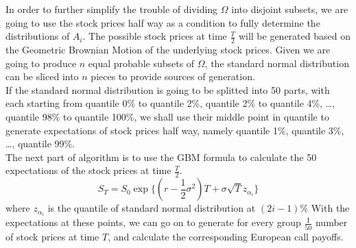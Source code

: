 In order to further simplify the trouble of dividing $\Omega$ into disjoint subsets, we are going to use the stock prices half way as a condition to fully determine the distributions of $A_{i}$. The possible stock prices at time $\frac{T}{2}$ will be generated based on the Geometric Brownian Motion of the underlying stock prices. Given we are going to produce $n$ equal probable subsets of $\Omega$, the standard normal distribution can be sliced into $n$ pieces to provide sources of generation.\\
If the standard normal distribution is going to be splitted into 50 parts, with each starting from quantile 0\% to quantile 2\%, quantile 2\% to quantile 4\%, \dots, quantile 98\% to quantile 100\%, we shall use their middle point in quantile to generate expectations of stock prices half way, namely quantile 1\%, quantile 3\%, \dots, quantile 99\%.\\
The next part of algorithm is to use the GBM formula to calculate the 50 expectations of the stock prices at time $\frac{T}{2}$.
$$S_{T} = S_{0}\exp\{(r-\frac{1}{2}\sigma^{2})T + \sigma\sqrt{T}z_{\alpha_{i}}\}$$
where $z_{\alpha_{i}}$ is the quantile of standard normal distribution at $(2i-1)\%$
With the expectations at these points, we can go on to generate for every group $\frac{\mathrm{I}}{50}$ number of stock prices at time $T$, and calculate the corresponding European call payoffs.
\newpage
